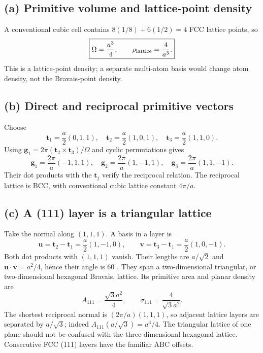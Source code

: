 \subsection*{(a) Primitive volume and lattice-point density}
A conventional cubic cell contains $8(1/8)+6(1/2)=4$ FCC lattice points, so
\[
\boxed{\Omega=\frac{a^3}{4},\qquad \rho_{\rm lattice}=\frac4{a^3}.}
\]
This is a lattice-point density; a separate multi-atom basis would change atom density, not the Bravais-point density.

\subsection*{(b) Direct and reciprocal primitive vectors}
Choose
\[
\mathbf t_1=\frac a2(0,1,1),\quad
\mathbf t_2=\frac a2(1,0,1),\quad
\mathbf t_3=\frac a2(1,1,0).
\]
Using $\mathbf g_1=2\pi(\mathbf t_2\times\mathbf t_3)/\Omega$ and cyclic permutations gives
\[
\boxed{\mathbf g_1=\frac{2\pi}{a}(-1,1,1),\quad
\mathbf g_2=\frac{2\pi}{a}(1,-1,1),\quad
\mathbf g_3=\frac{2\pi}{a}(1,1,-1).}
\]
Their dot products with the $\mathbf t_j$ verify the reciprocal relation. The reciprocal lattice is BCC, with conventional cubic lattice constant $4\pi/a$.

\subsection*{(c) A (111) layer is a triangular lattice}
Take the normal along $(1,1,1)$. A basis in a layer is
\[
\mathbf u=\mathbf t_2-\mathbf t_1=\frac a2(1,-1,0),\qquad
\mathbf v=\mathbf t_3-\mathbf t_1=\frac a2(1,0,-1).
\]
Both dot products with $(1,1,1)$ vanish. Their lengths are $a/\sqrt2$ and $\mathbf u\cdot\mathbf v=a^2/4$, hence their angle is $60^\circ$. They span a two-dimensional triangular, or two-dimensional hexagonal Bravais, lattice. Its primitive area and planar density are
\[
\boxed{A_{111}=\frac{\sqrt3a^2}{4},\qquad
\sigma_{111}=\frac4{\sqrt3a^2}.}
\]
The shortest reciprocal normal is $(2\pi/a)(1,1,1)$, so adjacent lattice layers are separated by $a/\sqrt3$; indeed $A_{111}(a/\sqrt3)=a^3/4$. The triangular lattice of one plane should not be confused with the three-dimensional hexagonal lattice. Consecutive FCC (111) layers have the familiar ABC offsets.

\begin{center}
\end{center}

